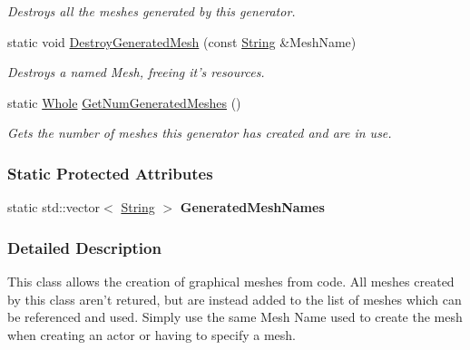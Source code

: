 \begin{DoxyCompactItemize}
\begin{DoxyCompactList}\small\item\em Destroys all the meshes generated by this generator. \item\end{DoxyCompactList}\item 
static void \hyperlink{classphys_1_1MeshGenerator_afb2061375887b4e4a4ab387806ea69e2}{DestroyGeneratedMesh} (const \hyperlink{namespacephys_aa03900411993de7fbfec4789bc1d392e}{String} \&MeshName)
\begin{DoxyCompactList}\small\item\em Destroys a named Mesh, freeing it's resources. \item\end{DoxyCompactList}\item 
static \hyperlink{namespacephys_a460f6bc24c8dd347b05e0366ae34f34a}{Whole} \hyperlink{classphys_1_1MeshGenerator_a4ebb68b11fb56a73a2f196303e1059aa}{GetNumGeneratedMeshes} ()
\begin{DoxyCompactList}\small\item\em Gets the number of meshes this generator has created and are in use. \item\end{DoxyCompactList}\end{DoxyCompactItemize}
\subsubsection*{Static Protected Attributes}
\begin{DoxyCompactItemize}
\item 
\hypertarget{classphys_1_1MeshGenerator_a367b9a58e548ebc2ed246a80878eed04}{
static std::vector$<$ \hyperlink{namespacephys_aa03900411993de7fbfec4789bc1d392e}{String} $>$ {\bfseries GeneratedMeshNames}}
\label{classphys_1_1MeshGenerator_a367b9a58e548ebc2ed246a80878eed04}

\end{DoxyCompactItemize}


\subsubsection{Detailed Description}
This class allows the creation of graphical meshes from code. All meshes created by this class aren't retured, but are instead added to the list of meshes which can be referenced and used. Simply use the same Mesh Name used to create the mesh when creating an actor or having to specify a mesh. 


